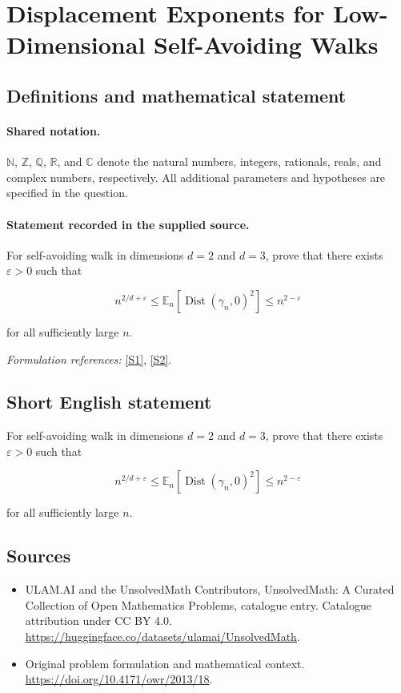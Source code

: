 \documentclass[11pt]{article}
\newcommand{\sref}[2]{\hyperlink{source:#1:#2}{[S#2]}}
\begin{document}
\section{Displacement Exponents for Low-Dimensional Self-Avoiding Walks}\label{statement}

\subsection{Definitions and mathematical statement}

\paragraph{Shared notation.}$\mathbb N$, $\mathbb Z$, $\mathbb Q$, $\mathbb R$, and $\mathbb C$ denote the natural numbers, integers, rationals, reals, and complex numbers, respectively. All additional parameters and hypotheses are specified in the question.


\paragraph{Statement recorded in the supplied source.}
For self-avoiding walk in dimensions $d=2$ and $d=3$, prove that there exists $\varepsilon>0$ such that

$$n^{2/d+\varepsilon}\leq \mathbb E_n[\operatorname{Dist}(\gamma_n,0)^2]\leq n^{2-\varepsilon}$$

for all sufficiently large $n$.
\par\smallskip\textit{Formulation references:} \sref{statement}{1}, \sref{statement}{2}.
\subsection{Short English statement}
For self-avoiding walk in dimensions $d=2$ and $d=3$, prove that there exists $\varepsilon>0$ such that

$$n^{2/d+\varepsilon}\leq \mathbb E_n[\operatorname{Dist}(\gamma_n,0)^2]\leq n^{2-\varepsilon}$$

for all sufficiently large $n$.
\subsection{Sources}
\begin{itemize}
\item[\hypertarget{source:statement:1}{S1}] ULAM.AI and the UnsolvedMath Contributors, UnsolvedMath: A Curated Collection of Open Mathematics Problems, catalogue entry. Catalogue attribution under CC BY 4.0.
\url{https://huggingface.co/datasets/ulamai/UnsolvedMath}.
\item[\hypertarget{source:statement:2}{S2}] Original problem formulation and mathematical context.
\url{https://doi.org/10.4171/owr/2013/18}.
\end{itemize}
\label{end:statement}
\end{document}
